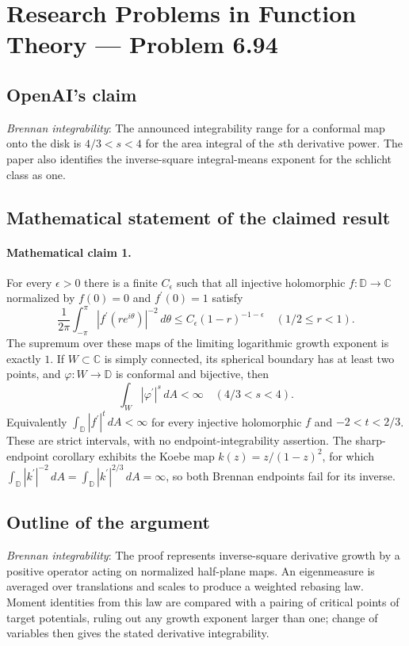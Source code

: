 \documentclass[11pt]{article}
\begin{document}
\section*{Research Problems in Function Theory — Problem 6.94}

\subsection{OpenAI's claim}
\textit{Brennan integrability}: The announced integrability range for a conformal map onto the disk is $4/3<s<4$ for the area integral of the $s$th derivative power. The paper also identifies the inverse-square integral-means exponent for the schlicht class as one.

\subsection{Mathematical statement of the claimed result}
\paragraph{Mathematical claim 1.} For every $\epsilon>0$ there is a finite $C_\epsilon$ such that all injective holomorphic $f:\mathbb D\to\mathbb C$ normalized by $f(0)=0$ and $f^\prime(0)=1$ satisfy \[\frac1{2\pi}\int_{-\pi}^{\pi}|f^\prime(re^{i\theta})|^{-2}\,d\theta\le C_\epsilon(1-r)^{-1-\epsilon}\quad(1/2\le r<1).\] The supremum over these maps of the limiting logarithmic growth exponent is exactly $1$. If $W\subset\mathbb C$ is simply connected, its spherical boundary has at least two points, and $\varphi:W\to\mathbb D$ is conformal and bijective, then \[\int_W|\varphi^\prime|^s\,dA<\infty\quad(4/3<s<4).\] Equivalently $\int_{\mathbb D}|f^\prime|^t\,dA<\infty$ for every injective holomorphic $f$ and $-2<t<2/3$. These are strict intervals, with no endpoint-integrability assertion. The sharp-endpoint corollary exhibits the Koebe map $k(z)=z/(1-z)^2$, for which $\int_{\mathbb D}|k^\prime|^{-2}\,dA=\int_{\mathbb D}|k^\prime|^{2/3}\,dA=\infty$, so both Brennan endpoints fail for its inverse.

\subsection{Outline of the argument}
\textit{Brennan integrability}: The proof represents inverse-square derivative growth by a positive operator acting on normalized half-plane maps. An eigenmeasure is averaged over translations and scales to produce a weighted rebasing law. Moment identities from this law are compared with a pairing of critical points of target potentials, ruling out any growth exponent larger than one; change of variables then gives the stated derivative integrability.
\end{document}

